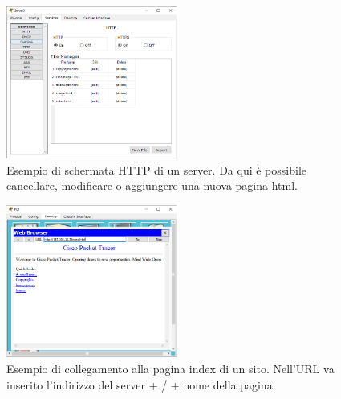 \begin{figure}[htbp]
    \centering
    \includegraphics[width=0.5\textwidth]{images/06.servizi-rete/http/01.conf-server.png}
    \caption{Esempio di schermata HTTP di un server. Da qui è possibile cancellare, modificare o aggiungere una nuova pagina html.}
    \label{fig:http-conf}
\end{figure}

\begin{figure}[htbp]
    \centering
    \includegraphics[width=0.5\textwidth]{images/06.servizi-rete/http/02.conf-client.png}
    \caption{Esempio di collegamento alla pagina index di un sito. Nell’URL va inserito l’indirizzo del server + / + nome della pagina.}
    \label{fig:http-test}
\end{figure}